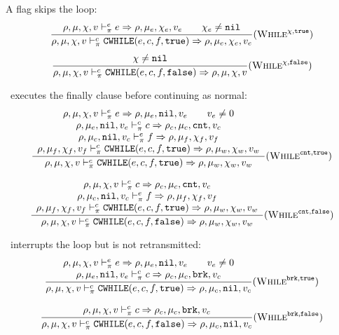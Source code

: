 A flag skips the loop:
\[\dfrac{\begin{array}{c}
    \rho,\mu,\chi,v \vdash_\pi^e e \Rightarrow \rho,\mu_e,\chi_e,v_e \qquad \chi_e\ne\texttt{nil} \\
\end{array}}{\rho,\mu,\chi,v \vdash_\pi^c \texttt{CWHILE}(e,c,f,\texttt{true}) \Rightarrow \rho,\mu_e,\chi_e,v_e} (\textsc{While}^{\chi,\texttt{true}})\]
\[\dfrac{\begin{array}{c}
    \chi\ne\texttt{nil}
\end{array}}{\rho,\mu,\chi,v \vdash_\pi^c \texttt{CWHILE}(e,c,f,\texttt{false}) \Rightarrow \rho,\mu,\chi,v} (\textsc{While}^{\chi,\texttt{false}})\]

\cnt\ executes the finally clause before continuing as normal:
\[\dfrac{\begin{array}{c}
    \rho,\mu,\chi,v \vdash_\pi^e e \Rightarrow \rho,\mu_e,\texttt{nil},v_e \qquad v_e \ne 0 \\
    \rho,\mu_e,\texttt{nil},v_e \vdash_\pi^c c \Rightarrow \rho_c,\mu_c,\texttt{cnt},v_c \\
    \rho,\mu_c,\texttt{nil},v_c \vdash_\pi^e f \Rightarrow \rho,\mu_f,\chi_f,v_f \\
    \rho,\mu_f,\chi_f,v_f \vdash_\pi^c \texttt{CWHILE}(e, c, f, \texttt{true}) \Rightarrow \rho,\mu_w,\chi_w,v_w
\end{array}}{\rho,\mu,\chi,v \vdash_\pi^c \texttt{CWHILE}(e, c, f, \texttt{true}) \Rightarrow \rho,\mu_w,\chi_w,v_w} (\textsc{While}^{\texttt{cnt},\texttt{true}})\]

\[\dfrac{\begin{array}{c}
    \rho,\mu,\chi,v \vdash_\pi^c c \Rightarrow \rho_c,\mu_c,\texttt{cnt},v_c \\
    \rho,\mu_c,\texttt{nil},v_c \vdash_\pi^e f \Rightarrow \rho,\mu_f,\chi_f,v_f \\
    \rho,\mu_f,\chi_f,v_f \vdash_\pi^c \texttt{CWHILE}(e, c, f, \texttt{true}) \Rightarrow \rho,\mu_w,\chi_w,v_w
\end{array}}{\rho,\mu,\chi,v \vdash_\pi^c \texttt{CWHILE}(e, c, f, \texttt{false}) \Rightarrow \rho,\mu_w,\chi_w,v_w} (\textsc{While}^{\texttt{cnt},\texttt{false}})\]

\brk\ interrupts the loop but is not retransmitted:
\[\dfrac{\begin{array}{c}
    \rho,\mu,\chi,v \vdash_\pi^e e \Rightarrow \rho,\mu_e,\texttt{nil},v_e \qquad v_e \ne 0 \\
    \rho,\mu_e,\texttt{nil},v_e \vdash_\pi^c c \Rightarrow \rho_c,\mu_c,\texttt{brk},v_c \\
\end{array}}{\rho,\mu,\chi,v \vdash_\pi^c \texttt{CWHILE}(e, c, f, \texttt{true}) \Rightarrow \rho,\mu_c,\texttt{nil},v_c} (\textsc{While}^{\texttt{brk},\texttt{true}})\]

\[\dfrac{\begin{array}{c}
    \rho,\mu,\chi,v \vdash_\pi^c c \Rightarrow \rho_c,\mu_c,\texttt{brk},v_c \\
\end{array}}{\rho,\mu,\chi,v \vdash_\pi^c \texttt{CWHILE}(e, c, f, \texttt{false}) \Rightarrow \rho,\mu_c,\texttt{nil},v_c} (\textsc{While}^{\texttt{brk},\texttt{false}})\]

